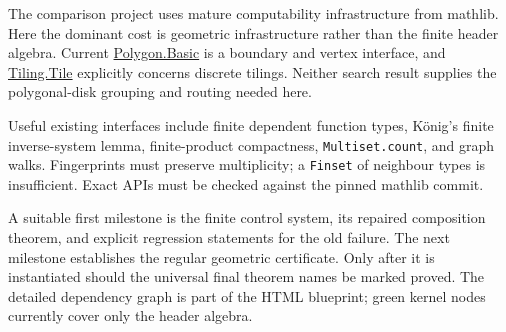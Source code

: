 The comparison project uses mature computability infrastructure from
mathlib. Here the dominant cost is geometric infrastructure rather than
the finite header algebra. Current
\href{https://leanprover-community.github.io/mathlib4_docs/Mathlib/Geometry/Polygon/Basic.html}
{Polygon.Basic} is a boundary and vertex interface, and
\href{https://leanprover-community.github.io/mathlib4_docs/Mathlib/Combinatorics/Tiling/Tile.html}
{Tiling.Tile} explicitly concerns discrete tilings. Neither search result
supplies the polygonal-disk grouping and routing needed here.

Useful existing interfaces include finite dependent function types,
K\"onig's finite inverse-system lemma, finite-product compactness,
\texttt{Multiset.count}, and graph walks. Fingerprints must preserve
multiplicity; a \texttt{Finset} of neighbour types is insufficient.
Exact APIs must be checked against the pinned mathlib commit.

A suitable first milestone is the finite control system, its repaired
composition theorem, and explicit regression statements for the old
failure. The next milestone establishes the regular geometric certificate.
Only after it is instantiated should the universal final theorem names
be marked proved. The detailed dependency graph is part of the HTML
blueprint; green kernel nodes currently cover only the header algebra.
